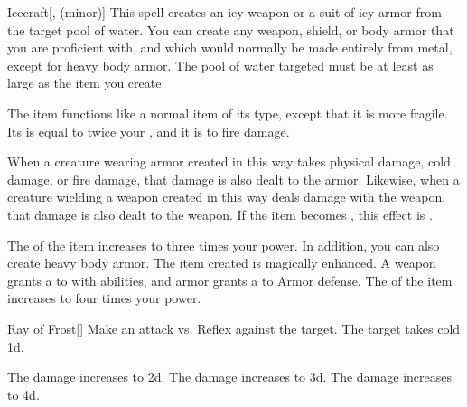 \lowercase{\hypertarget{spell:Icecraft}{}}\label{spell:Icecraft}
\begin{freeability}[Rank 1]{\hypertarget{spell:Icecraft}{Icecraft}}[,  (minor)]
This spell creates an icy weapon or a suit of icy armor from the target pool of water.
You can create any weapon, shield, or body armor that you are proficient with, and which would normally be made entirely from metal, except for heavy body armor.
The pool of water targeted must be at least as large as the item you create.

The item functions like a normal item of its type, except that it is more fragile.
Its  is equal to twice your , and it is  to fire damage.

When a creature wearing armor created in this way takes physical damage, cold damage, or fire damage, that damage is also dealt to the armor.
Likewise, when a creature wielding a weapon created in this way deals damage with the weapon, that damage is also dealt to the weapon.
If the item becomes , this effect is .

\rankline
{} The  of the item increases to three times your power.
In addition, you can also create heavy body armor.
 The item created is magically enhanced.
A weapon grants a   to  with  abilities,
and armor grants a   to Armor defense.
 The  of the item increases to four times your power.
\end{freeability}
\vspace{0.25em}



\lowercase{\hypertarget{spell:Ray of Frost}{}}\label{spell:Ray of Frost}
\begin{freeability}[Rank 1]{\hypertarget{spell:Ray of Frost}{Ray of Frost}}[]
Make an attack vs. Reflex against the target.
\hit The target takes cold  \plus1d.

\rankline
{} The damage increases to  \plus2d.
 The damage increases to  \plus3d.
 The damage increases to  \plus4d.
\end{freeability}
\vspace{0.25em}



